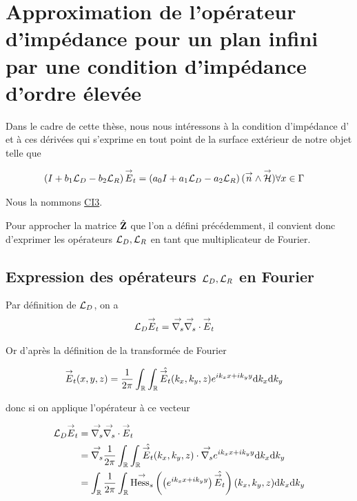 \section{Approximation de l'opérateur d'impédance pour un plan infini par une condition d'impédance d'ordre élevée}

    Dans le cadre de cette thèse, nous nous intéressons à la condition d'impédance d'\cite{aubakirov_electromagnetic_2014} et à ces dérivées qui s'exprime en tout point de la surface extérieur de notre objet telle que

    \begin{align}
        \left(I + b_1 {\mathcal{L}_D}{} - b_2 {\mathcal{L}_R} \right){\overset{\rightarrow}{E}}_t = \left(a_0 I + a_1 {\mathcal{L}_D}{} - a_2 {\mathcal{L}_R} \right)({\overset{\rightarrow}{n}} \wedge {\overset{\rightarrow}{\mathcal{H}}}) & \forall x \in \Gamma
    \end{align}

    Nous la nommons \hyperlink{ci3}{CI3}.

    Pour approcher la matrice \(\hat{\mathbf{Z}}\) que l'on a défini précédemment, il convient donc d'exprimer les opérateurs \({\mathcal{L}_D}, {\mathcal{L}_R}\) en tant que multiplicateur de Fourier.

  \subsection[Expression des opérateurs LD LR en Fourier]{Expression des opérateurs \({\mathcal{L}_D},{\mathcal{L}_R}\) en Fourier}

    Par définition de \({\mathcal{L}_D}\), on a
    \begin{align}
      {\mathcal{L}_D} {\overset{\rightarrow}{E}}_t & = {\overset{\rightarrow}{\nabla_s}}{} {\overset{\rightarrow}{\nabla_s}} \cdot{} {\overset{\rightarrow}{E}}_t
    \end{align}

    Or d’après la définition de la transformée de Fourier

    \begin{align}
      {\overset{\rightarrow}{E}}_t(x,y,z) & = \dfrac{1}{2\pi}\int_\mathbb R\int_\mathbb R \hat{{\overset{\rightarrow}{E}}_t}(k_x,k_y,z)e^{ik_xx + ik_yy}\mathrm{d}{k_x}\mathrm{d}{k_y}
    \end{align}

    donc si on applique l'opérateur à ce vecteur

    \begin{align}
      {\mathcal{L}_D} {\overset{\rightarrow}{E}}_t
      & = {\overset{\rightarrow}{\nabla_s}}{} {\overset{\rightarrow}{\nabla_s}} \cdot{} {\overset{\rightarrow}{E}}_t
      \\
      &={\overset{\rightarrow}{\nabla_s}}{} \dfrac{1}{2\pi}\int_\mathbb R\int_\mathbb R \hat{{\overset{\rightarrow}{E}}_t}(k_x,k_y,z) \cdot {\overset{\rightarrow}{\nabla_s}}{} e^{ik_xx + ik_yy}\mathrm{d}{k_x}\mathrm{d}{k_y}
      \\
      &=\int_\mathbb R \dfrac{1}{2\pi}\int_\mathbb R {\overset{\rightarrow}{\operatorname{Hess}_s}}{}\left(\left( e^{ik_xx + ik_yy} \right) \hat{{\overset{\rightarrow}{E}}_t}\right)(k_x,k_y,z)\mathrm{d}{k_x}\mathrm{d}{k_y}
    \end{align}


